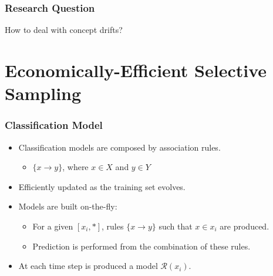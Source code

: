 \documentclass[14pt]{beamer}
\begin{document}
\begin{frame}\frametitle{Research Question}

\begin{center}
\large{How to deal with concept drifts?}
\end{center}
\end{frame}

\section{Economically-Efficient Selective Sampling}
\begin{frame}\frametitle{Classification Model}
\begin{itemize}
\item Classification models are composed by association rules.
  \begin{itemize}
    \item $\{x \to y\}$, where $x \in X$ and $y \in Y$
  \end{itemize}
\item Efficiently updated as the training set evolves.
\item Models are built on-the-fly:
  \begin{itemize}
    \item For a given $[x_i, *]$, rules $\{x \to y\}$ such that $x \in x_i$ are produced.
    \item Prediction is performed from the combination of these rules.
  \end{itemize}
\item At each time step is produced a model $\mathcal{R}(x_i)$.
\end{itemize}
\end{frame}
\end{document}

